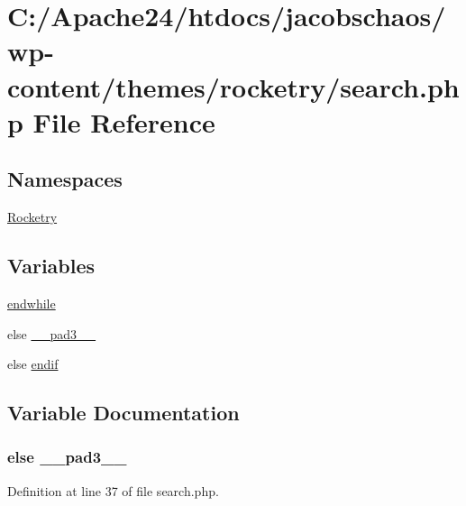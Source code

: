\hypertarget{search_8php}{}\section{C\+:/\+Apache24/htdocs/jacobschaos/wp-\/content/themes/rocketry/search.php File Reference}
\label{search_8php}
\subsection*{Namespaces}
\begin{DoxyCompactItemize}
\item 
 \hyperlink{namespace_rocketry}{Rocketry}
\end{DoxyCompactItemize}
\subsection*{Variables}
\begin{DoxyCompactItemize}
\item 
\hyperlink{search_8php_a1b05dae45f9e3f4c1fe86048550d2c5b}{endwhile}
\item 
else \hyperlink{search_8php_ad3aa1069376b85bd4e503b216d54b18d}{\+\_\+\+\_\+pad3\+\_\+\+\_\+}
\item 
else \hyperlink{search_8php_ab4d017bcc79cd2827c3dce8af2570e91}{endif}
\end{DoxyCompactItemize}


\subsection{Variable Documentation}
\hypertarget{search_8php_ad3aa1069376b85bd4e503b216d54b18d}{}
\subsubsection[{\+\_\+\+\_\+pad3\+\_\+\+\_\+}]{\setlength{\rightskip}{0pt plus 5cm}else \+\_\+\+\_\+pad3\+\_\+\+\_\+}\label{search_8php_ad3aa1069376b85bd4e503b216d54b18d}


Definition at line 37 of file search.\+php.

\hypertarget{search_8php_ab4d017bcc79cd2827c3dce8af2570e91}{}
